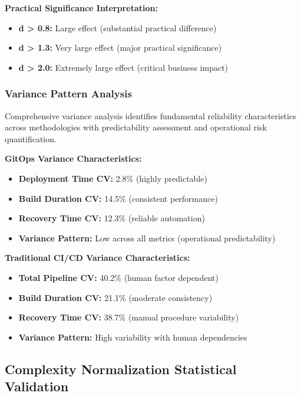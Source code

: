 \textbf{Practical Significance Interpretation:}
\begin{itemize}
\item \textbf{d > 0.8:} Large effect (substantial practical difference) \cite{effect_size_interpretation}
\item \textbf{d > 1.3:} Very large effect (major practical significance) \cite{effect_size_interpretation}
\item \textbf{d > 2.0:} Extremely large effect (critical business impact) \cite{effect_size_interpretation}
\end{itemize}

\subsubsection{Variance Pattern Analysis}

Comprehensive variance analysis identifies fundamental reliability characteristics across methodologies with predictability assessment and operational risk quantification.

\textbf{GitOps Variance Characteristics:}
\begin{itemize}
\item \textbf{Deployment Time CV:} 2.8\% (highly predictable)
\item \textbf{Build Duration CV:} 14.5\% (consistent performance)
\item \textbf{Recovery Time CV:} 12.3\% (reliable automation)
\item \textbf{Variance Pattern:} Low across all metrics (operational predictability)
\end{itemize}

\textbf{Traditional CI/CD Variance Characteristics:}
\begin{itemize}
\item \textbf{Total Pipeline CV:} 40.2\% (human factor dependent)
\item \textbf{Build Duration CV:} 21.1\% (moderate consistency)
\item \textbf{Recovery Time CV:} 38.7\% (manual procedure variability)
\item \textbf{Variance Pattern:} High variability with human dependencies
\end{itemize}

\subsection{Complexity Normalization Statistical Validation}
\label{subsec:complexity_normalization_validation}

